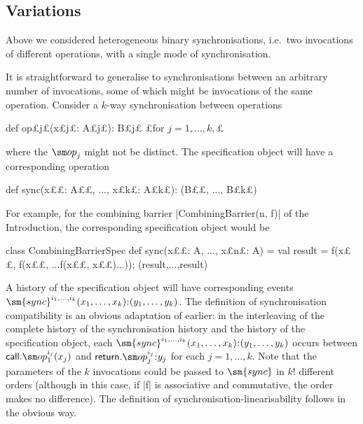 
\subsection{Variations}
\label{ssec:spec-variations}

Above we considered heterogeneous binary synchronisations, i.e.~two
invocations of different operations, with a single mode of synchronisation.

It is straightforward to generalise to synchronisations between an arbitrary
number of invocations, some of which might be invocations of the same
operation.  Consider a $k$-way synchronisation between operations
\begin{scala}
  def op£\s j£(x£\s j£: A£\s j£): B£\s j£   £for $j = 1, \ldots, k,$£
\end{scala}
%
where the $\op_j$ might not be distinct.
The specification object will have a corresponding operation
%
\begin{scala} 
  def sync(x££: A££, ..., x£\s k£: A£\s k£): (B££, ..., B£\s k£)
\end{scala}
%
For example, for the combining barrier |CombiningBarrier(n, f)| of the
Introduction, the corresponding specification object would be
\begin{scala}
class CombiningBarrierSpec{
  def sync(x££: A, ..., x£\s n£: A) = {
    val result = f(x££, f(x££, ...f(x££, x££)...)); (result,...,result)
  }
}
\end{scala}

A history of the specification object will have corresponding events
$\sm{sync}^{i_1, \ldots, i_k}(x_1, \ldots, x_k)\:: (y_1, \ldots, y_k)$.
%
The definition of synchronisation compatibility is an obvious adaptation of
earlier: in the interleaving of the complete history of the synchronisation
history and the history of the specification object, each $\sm{sync}^{i_1,
  \ldots, i_k}(x_1, \ldots, x_k)\:: (y_1, \ldots, y_k)$ occurs between
$\call.\op_1^{i_j}(x_j)$ and $\return.\op_j^{i_j}\::y_j$ for each $j = 1,
\ldots, k$.  Note that the parameters of the $k$ invocations could be passed
to $\sm{sync}$ in $k!$ different orders (although in this case, if |f| is
associative and commutative, the order makes no difference). 
The definition of synchronisation-linearisability follows in the obvious
way. 


